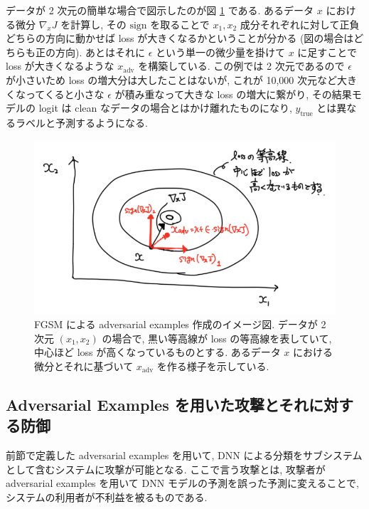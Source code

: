 データが 2 次元の簡単な場合で図示したのが図 \ref{fig:fgsm-loss} である.
あるデータ $x$ における微分 $\nabla_x J$ を計算し, その $\text{sign}$ を取ることで $x_1, x_2$ 成分それぞれに対して正負どちらの方向に動かせば loss が大きくなるかということが分かる (図の場合はどちらも正の方向).
あとはそれに $\epsilon$ という単一の微少量を掛けて $x$ に足すことで loss が大きくなるような $x_{\text{adv}}$ を構築している.
この例では 2 次元であるので $\epsilon$ が小さいため loss の増大分は大したことはないが, これが 10,000 次元など大きくなってくると小さな $\epsilon$ が積み重なって大きな loss の増大に繋がり, その結果モデルの logit は clean なデータの場合とはかけ離れたものになり, $y_{\text{true}}$ とは異なるラベルと予測するようになる.
%
\begin{figure}[htbp]
\begin{center}
\includegraphics[width=12.0cm]{figures/fgsm-loss.pdf}
\end{center}
\caption{
FGSM による adversarial examples 作成のイメージ図.
データが 2 次元 $(x_1, x_2)$ の場合で, 黒い等高線が loss の等高線を表していて, 中心ほど loss が高くなっているものとする.
あるデータ $x$ における微分とそれに基づいて $x_{\text{adv}}$ を作る様子を示している.
}
\label{fig:fgsm-loss}
\end{figure}
%



\subsection{Adversarial Examples を用いた攻撃とそれに対する防御}
\label{subsec:attack-and-defense}
前節で定義した adversarial examples を用いて, DNN による分類をサブシステムとして含むシステムに攻撃が可能となる.
ここで言う攻撃とは, 攻撃者が adversarial examples を用いて DNN モデルの予測を誤った予測に変えることで, システムの利用者が不利益を被るものである.

